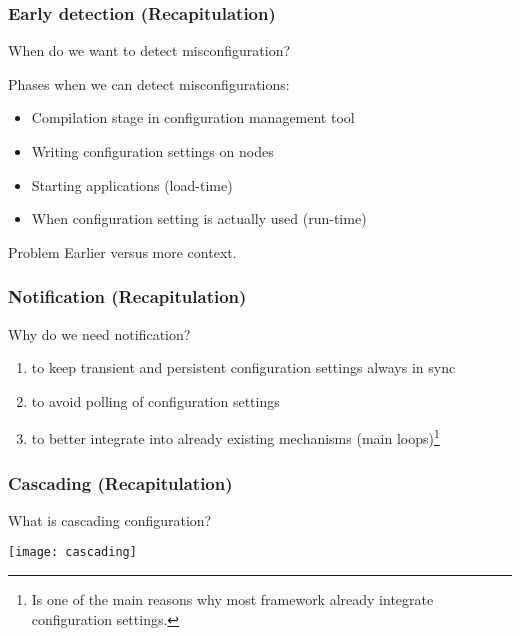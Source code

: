 \begin{frame}
	\frametitle{Early detection (Recapitulation)}
	\begin{task}
	When do we want to detect misconfiguration?
	\end{task}

	\pause

	Phases when we can detect misconfigurations:
	\begin{itemize} %
	\item Compilation stage in configuration management tool
	\item Writing configuration settings on nodes
	\item Starting applications (load-time)
	\item When configuration setting is actually used (run-time)
	\end{itemize}

	\pause[\thebeamerpauses]

	\begin{alertblock}{Problem}
	Earlier versus more context.
	\end{alertblock}
\end{frame}

\begin{frame}
	\frametitle{Notification (Recapitulation)}

	\begin{task}
	Why do we need notification?
	\end{task}

	\pause

	\begin{enumerate}
	\item to keep transient and persistent configuration settings always in sync~\cite{jin2014configurations}
	\item to avoid polling of configuration settings
	\item to better integrate into already existing mechanisms (main loops)\footnote{Is one of the main reasons why most framework already integrate configuration settings.}
	\end{enumerate}

\end{frame}

\begin{frame}
	\frametitle{Cascading (Recapitulation)}

	\begin{task}
	What is cascading configuration?
	\end{task}
	\vspace{1em}

	\pause

	\texttt{[image: cascading]}
\end{frame}

